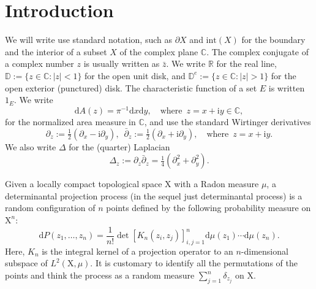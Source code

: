 \documentclass{birkart}
\theoremstyle{definition}
\theoremstyle{remark}
\numberwithin{equation}{section}
\numberwithin{figure}{section}
\newcommand{\1}{{\mathbf 1}}
\newcommand{\C}{{\mathbb C}}
\newcommand{\D}{{\mathbb D}}
\newcommand{\R}{{\mathbb R}}
\newcommand{\diff}{{\mathrm d}}
\newcommand{\imag}{{\mathrm i}}
\begin{document}
\maketitle


\addtolength{\textheight}{2.2cm}















\section{Introduction}

We will write use standard notation, such as $\partial X$ and $\mathrm{int}(X)$
for the boundary and the interior of a subset $X$ of the complex plane $\C$.
The complex conjugate of a complex number $z$ is usually written as 
$\bar z$. 
We write $\R$ for the real line, $\D:=\{z\in\C:|z|<1\}$ for the open 
unit disk, and $\D^e:=\{z\in\C:|z|>1\}$ for the open exterior (punctured) 
disk. The characteristic function of a set $E$ is written $1_E$. We write 
\[
\diff A(z)=\pi^{-1}\diff x \diff y,\quad\text{where}\,\,\,
z=x+\imag y\in\C,
\]
for the normalized area measure in $\C$, and use the standard Wirtinger 
derivatives
\[
\partial_z:=\tfrac12(\partial_x-\imag\partial_y),\,\,\,
\bar\partial_z:=\tfrac12(\partial_x+\imag\partial_y),
\quad\text{where}\,\,\, z=x+\imag y.
\] 
We also write $\Delta$ for the (quarter) Laplacian
\[
\Delta_z:=\partial_z\bar\partial_z=\tfrac14(\partial_x^2+\partial_y^2).
\]

\medskip
{} 
Given a locally compact topological space $\mathrm{X}$ with a Radon measure 
$\mu$, a determinantal projection process (in the sequel just determinantal 
process) is a random configuration of $n$ points defined by the following 
probability measure on $\mathrm{X}^n$: 
\begin{equation}
\diff P(z_1,\ldots,z_n) = \frac{1}{n!} \det[K_n(z_i, z_j)]_{i,j=1}^n 
\diff \mu(z_1)\cdots\diff \mu(z_n). 
\label{eq-probdist}
\end{equation}
Here, $K_n$ is the integral kernel of a projection operator to an 
$n$-dimensional subspace of $L^2(\mathrm{X},\mu)$. It is customary to 
identify all the permutations of the points and think the process as a 
random measure $\sum_{j=1}^n \delta_{z_j}$ on $\mathrm{X}$.  
\end{document}
